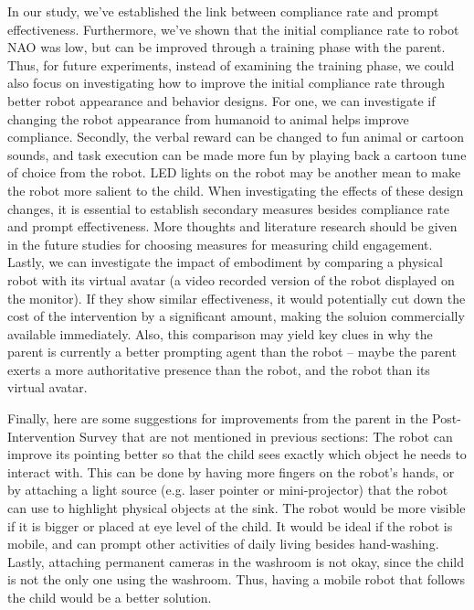 \documentclass{ut-thesis}
\begin{document}
In our study, we've established the link between compliance rate and prompt effectiveness.  Furthermore, we've shown that the initial compliance rate to robot NAO was low, but can be improved through a training phase with the parent.  Thus, for future experiments, instead of examining the training phase, we could also focus on investigating how to improve the initial compliance rate through better robot appearance and behavior designs.  For one, we can investigate if changing the robot appearance from humanoid to animal helps improve compliance.  Secondly, the verbal reward can be changed to fun animal or cartoon sounds, and task execution can be made more fun by playing back a cartoon tune of choice from the robot.  LED lights on the robot may be another mean to make the robot more salient to the child.  When investigating the effects of these design changes, it is essential to establish secondary measures besides compliance rate and prompt effectiveness.  More thoughts and literature research should be given in the future studies for choosing measures for measuring child engagement.  Lastly, we can investigate the impact of embodiment by comparing a physical robot with its virtual avatar (a video recorded version of the robot displayed on the monitor).  If they show similar effectiveness, it would potentially cut down the cost of the intervention by a significant amount, making the soluion commercially available immediately.  Also, this comparison may yield key clues in why the parent is currently a better prompting agent than the robot -- maybe the parent exerts a more authoritative presence than the robot, and the robot than its virtual avatar.

Finally, here are some suggestions for improvements from the parent in the Post-Intervention Survey that are not mentioned in previous sections:  The robot can improve its pointing better so that the child sees exactly which object he needs to interact with.  This can be done by having more fingers on the robot's hands, or by attaching a light source (e.g. laser pointer or mini-projector) that the robot can use to highlight physical objects at the sink.  The robot would be more visible if it is bigger or placed at eye level of the child.  It would be ideal if the robot is mobile, and can prompt other activities of daily living besides hand-washing.  Lastly, attaching permanent cameras in the washroom is not okay, since the child is not the only one using the washroom.  Thus, having a mobile robot that follows the child would be a better solution.
\end{document}
